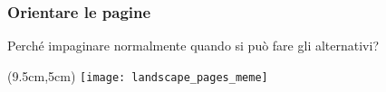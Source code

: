 \begin{frame}
  \frametitle{Orientare le pagine}

  \begin{center}
   
   \begin{turn}{60}
      \begin{minipage}{5cm}
        \begin{center}
          \huge Perché impaginare normalmente quando si può fare gli 
alternativi?
       \end{center}
     \end{minipage}
   \end{turn}
  \end{center}
  
  \begin{textblock*}{5cm}(9.5cm,5cm)
   \texttt{[image: landscape\_pages\_meme]}
 \end{textblock*}
\end{frame}